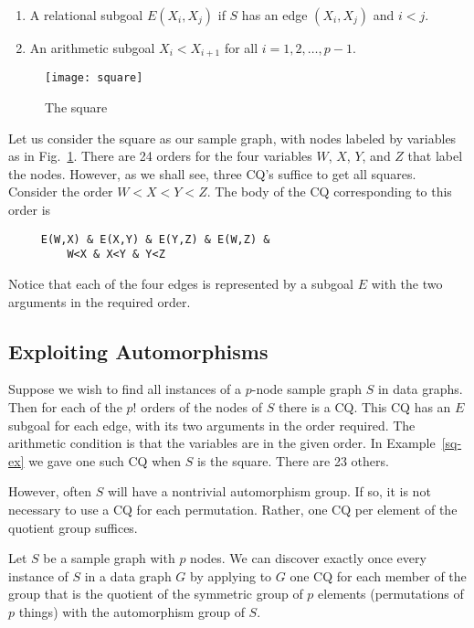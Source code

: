 \begin{enumerate}
\item A relational subgoal $E(X_i,X_j)$ if $S$ has an edge $(X_i,X_j)$ and $i<j$.

\item An arithmetic subgoal $X_i<X_{i+1}$ for all $i=1,2,\ldots,p-1$.
\end{enumerate}

\begin{figure}[htfb]
\centerline{\texttt{[image: square]}}
\caption{The square}
\label{sq-fig}
\end{figure}

\begin{example}
\label{sq-ex}
Let us consider the square as our sample graph, with nodes labeled by variables as in Fig.~\ref{sq-fig}.  There are 24 orders for the four variables $W$, $X$, $Y$, and $Z$ that label the nodes.  However,  as we shall see, three CQ's suffice to get all squares.  Consider the order $W<X<Y<Z$.  The body of the CQ corresponding to this order is

\begin{verbatim}
     E(W,X) & E(X,Y) & E(Y,Z) & E(W,Z) &
         W<X & X<Y & Y<Z
\end{verbatim}
Notice that each of the four edges is represented by a subgoal $E$ with the two arguments in the required order.
\end{example}

\subsection{Exploiting Automorphisms}
\label{cq-perm-subsect}

Suppose we wish to find all instances of a $p$-node sample graph $S$ in data graphs.  Then for each of the $p!$ orders of the nodes of $S$ there is a CQ.  This CQ has an $E$ subgoal for each edge, with its two arguments in the order required.  The arithmetic condition is that the variables are in the given order.
In Example~\ref{sq-ex} we gave one such CQ when $S$ is the square.  There are 23 others.

However, often $S$ will have a nontrivial automorphism group.  If so, it is not necessary to use a CQ for each permutation.  Rather, one CQ per element of the quotient group suffices.

\begin{theorem}\label{automorphism-th}
Let $S$ be a sample graph with $p$ nodes. We can discover exactly once every instance of $S$ in a data graph $G$ by applying to $G$ one CQ for each member of the group that is the quotient of the symmetric group of $p$ elements (permutations of $p$ things) with the automorphism group of $S$.
\end{theorem}


